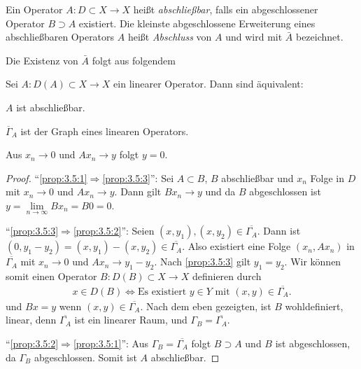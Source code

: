 \begin{defn*}
Ein Operator $A : D \subset X \to X$ heißt
\emph{abschließbar}, falls ein abgeschlossener
Operator $B \supset A$ existiert.
Die kleinste abgeschlossene Erweiterung eines abschließbaren
Operators $A$ heißt \emph{Abschluss} von $A$ und wird
mit $\bar{A}$ bezeichnet.
\end{defn*}

Die Existenz von $\bar{A}$ folgt aus folgendem

\begin{prop}
\label{prop:3.5}
Sei $A : D(A) \subset X \to X$ ein linearer Operator.
Dann sind äquivalent:
\begin{equivenum}
\item\label{prop:3.5:1} $A$ ist abschließbar.
\item\label{prop:3.5:2} $\overline{\Gamma}_A$ ist der Graph eines linearen
Operators.
\item\label{prop:3.5:3} Aus $x_n \to 0$ und $Ax_n \to y$ folgt $y = 0$.\fishhere
\end{equivenum}
\end{prop}
\begin{proof}
``\ref{prop:3.5:1}$\Rightarrow$\ref{prop:3.5:3}'': Sei $A\subset B$, $B$
abschließbar und $x_n$ Folge in $D$ mit $x_n\to 0$ und $Ax_n\to y$. Dann gilt
$Bx_n \to y$ und da $B$ abgeschlossen ist $y = \lim\limits_{n\to \infty} Bx_n =
B0 = 0$.

``\ref{prop:3.5:3}$\Rightarrow$\ref{prop:3.5:2}'': Seien $(x,y_1),(x,y_2)\in
\overline{\Gamma_A}$. Dann ist $(0,y_1-y_2) = (x,y_1)-(x,y_2)\in
\overline{\Gamma_A}$. Also existiert eine Folge $(x_n,Ax_n)$ in
$\overline{\Gamma_A}$ mit $x_n\to 0$ und $Ax_n\to y_1-y_2$. Nach
\ref{prop:3.5:3} gilt $y_1=y_2$. Wir können somit einen Operator $B:D(B)\subset
X\to X$ definieren durch
\begin{align*}
x\in D(B) \Leftrightarrow \text{Es existiert }y\in Y\text{ mit }(x,y)\in
\overline{\Gamma_A}.
\end{align*}
und $Bx=y$ wenn $(x,y)\in \overline{\Gamma_A}$. Nach dem eben gezeigten, ist $B$
wohldefiniert, linear, denn $\overline{\Gamma_A}$ ist ein linearer Raum, und
$\Gamma_B = \overline{\Gamma_A}$.

``\ref{prop:3.5:2}$\Rightarrow$\ref{prop:3.5:1}'': Aus
$\Gamma_B=\overline{\Gamma_A}$ folgt $B\supset A$ und $B$ ist abgeschlossen, da
$\Gamma_B$ abgeschlossen. Somit ist $A$ abschließbar.\qedhere
\end{proof}


